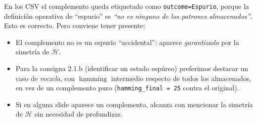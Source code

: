 \documentclass[11pt]{article}
\newcommand{\Hen}{\mathcal{H}}
\begin{document}
En los CSV el complemento queda etiquetado como \texttt{outcome=Espurio}, porque la definición operativa de “espurio” es \emph{“no es ninguno de los patrones almacenados”}. Esto es correcto. Pero conviene tener presente:

\begin{itemize}
  \item El complemento no es un espurio “accidental”: aparece \emph{garantizado} por la simetría de $\Hen$.
  \item Para la consigna 2.1.b (identificar un estado espúreo) preferimos destacar un caso de \emph{mezcla}, con $\operatorname{hamming}$ intermedio respecto de todos los almacenados, en vez de un complemento puro (\texttt{hamming\_final = 25} contra el original).
  \item Si en alguna slide aparece un complemento, alcanza con mencionar la simetría de $\Hen$ sin necesidad de profundizar.
\end{itemize}
\end{document}
